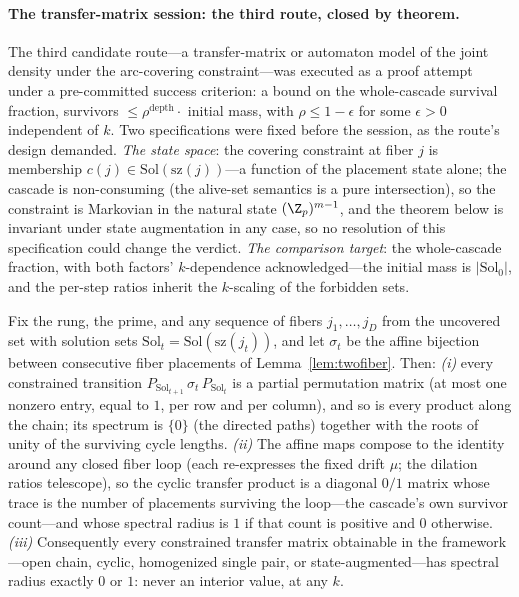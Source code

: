 \paragraph{The transfer-matrix session: the third route, closed by
theorem.}
The third candidate route---a transfer-matrix or automaton model of the
joint density under the arc-covering constraint---was executed as a
proof attempt under a pre-committed success criterion: a bound on the
whole-cascade survival fraction, survivors $\le\rho^{\mathrm{depth}}
\cdot$ initial mass, with $\rho\le 1-\epsilon$ for some $\epsilon>0$
independent of $k$. Two specifications were fixed before the session,
as the route's design demanded. \emph{The state space}: the covering
constraint at fiber $j$ is membership
$c(j)\in\mathrm{Sol}(\mathrm{sz}(j))$---a function of the placement
state alone; the cascade is non-consuming (the alive-set semantics is
a pure intersection), so the constraint is Markovian in the natural
state $(\Z_p)^{m-1}$, and the theorem below is invariant under state
augmentation in any case, so no resolution of this specification could
change the verdict. \emph{The comparison target}: the whole-cascade
fraction, with both factors' $k$-dependence acknowledged---the initial
mass is $|\mathrm{Sol}_0|$, and the per-step ratios inherit the
$k$-scaling of the forbidden sets.

\begin{lemma}\label{lem:monomial}
Fix the rung, the prime, and any sequence of fibers $j_1,\dots,j_D$
from the uncovered set with solution sets
$\mathrm{Sol}_t=\mathrm{Sol}(\mathrm{sz}(j_t))$, and let $\sigma_t$
be the affine bijection between consecutive fiber placements of
Lemma~\ref{lem:twofiber}. Then: \emph{(i)} every constrained
transition $P_{\mathrm{Sol}_{t+1}}\,\sigma_t\,P_{\mathrm{Sol}_t}$ is
a partial permutation matrix (at most one nonzero entry, equal to $1$,
per row and per column), and so is every product along the chain; its
spectrum is $\{0\}$ (the directed paths) together with the roots of
unity of the surviving cycle lengths. \emph{(ii)} The affine maps
compose to the identity around any closed fiber loop (each re-expresses
the fixed drift $\mu$; the dilation ratios telescope), so the cyclic
transfer product is a diagonal $0/1$ matrix whose trace is the number
of placements surviving the loop---the cascade's own survivor
count---and whose spectral radius is $1$ if that count is positive and
$0$ otherwise. \emph{(iii)} Consequently every constrained transfer
matrix obtainable in the framework---open chain, cyclic, homogenized
single pair, or state-augmented---has spectral radius exactly $0$ or
$1$: never an interior value, at any $k$.
\end{lemma}

